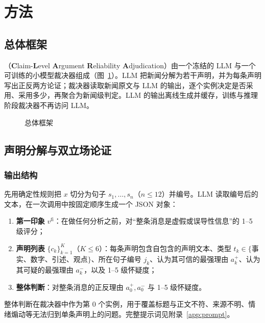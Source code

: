 \section{\method{} 方法}\label{sec:method}

\subsection{总体框架}

\method{}（\textbf{C}laim-\textbf{L}evel \textbf{A}rgument \textbf{R}eliability \textbf{A}djudication）由一个冻结的 LLM 与一个可训练的小模型裁决器组成（图~\ref{fig:framework}）。LLM 把新闻分解为若干声明，并为每条声明写出正反两方论证；裁决器读取新闻原文与 LLM 的输出，逐个实例决定是否采用、采用多少，再聚合为新闻级判定。LLM 的输出离线生成并缓存，训练与推理阶段裁决器不再访问 LLM。

\begin{figure}[htbp]
\centering
\resizebox{\linewidth}{!}{}
\caption{\method{} 总体框架}\label{fig:framework}
\end{figure}

\subsection{声明分解与双立场论证}\label{sec:llm}

\subsubsection{输出结构}
先用确定性规则把 $x$ 切分为句子 $s_1,\dots,s_n$（$n\le 12$）并编号。LLM 读取编号后的文本，在一次调用中按固定顺序生成一个 JSON 对象：
\begin{enumerate}
\item \textbf{第一印象} $v^{\mathrm{fi}}$：在做任何分析之前，对“整条消息是虚假或误导性信息”的 1--5 级评分；
\item \textbf{声明列表} $\{c_k\}_{k=1}^{K}$（$K\le 6$）：每条声明包含自包含的声明文本、类型 $t_k\in\{$事实、数字、引述、观点$\}$、所在句子编号 $j_k$、认为其可信的最强理由 $a_k^+$、认为其可疑的最强理由 $a_k^-$，以及 1--5 级怀疑度；
\item \textbf{整体判断}：对整条消息的正反理由 $a_0^+,a_0^-$ 与 1--5 级怀疑度。
\end{enumerate}
整体判断在裁决器中作为第 $0$ 个实例，用于覆盖标题与正文不符、来源不明、情绪煽动等无法归到单条声明上的问题。完整提示词见附录~\ref{app:prompt}。

